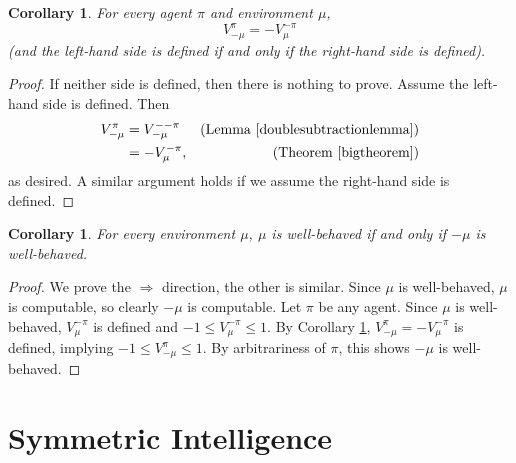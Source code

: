 \documentclass{article}
\newtheorem{corollary}[theorem]{Corollary}
\begin{document}
\begin{corollary}
\label{twistcorollary}
    For every agent $\pi$ and environment $\mu$,
    \[V^\pi_{-\mu}=-V^{-\pi}_{\mu}\]
    (and the left-hand side is defined if and only if the right-hand side is defined).
\end{corollary}

\begin{proof}
    If neither side is defined, then there is nothing to prove.
    Assume the left-hand side is defined. Then
    \begin{align*}
        V^\pi_{-\mu} &= V^{--\pi}_{-\mu} &\mbox{(Lemma \ref{doublesubtractionlemma})}\\
            &= -V^{-\pi}_\mu, &\mbox{(Theorem \ref{bigtheorem})}
    \end{align*}
    as desired. A similar argument holds if we assume the right-hand side is defined.
\end{proof}

\begin{corollary}
\label{wisminuswcorollary}
    For every environment $\mu$, $\mu$ is well-behaved if and only if $-\mu$
    is well-behaved.
\end{corollary}

\begin{proof}
    We prove the $\Rightarrow$ direction, the other is similar.
    Since $\mu$ is well-behaved, $\mu$ is computable, so clearly $-\mu$ is computable.
    Let $\pi$ be any agent. Since $\mu$ is well-behaved, $V^{-\pi}_\mu$ is defined
    and $-1\leq V^{-\pi}_\mu\leq 1$.
    By Corollary \ref{twistcorollary},
    $V^\pi_{-\mu}=-V^{-\pi}_\mu$ is defined,
    implying $-1\leq V^\pi_{-\mu}\leq 1$.
    By arbitrariness of $\pi$, this shows $-\mu$ is well-behaved.
\end{proof}

\section{Symmetric Intelligence}
\label{mainsecn}
\end{document}
